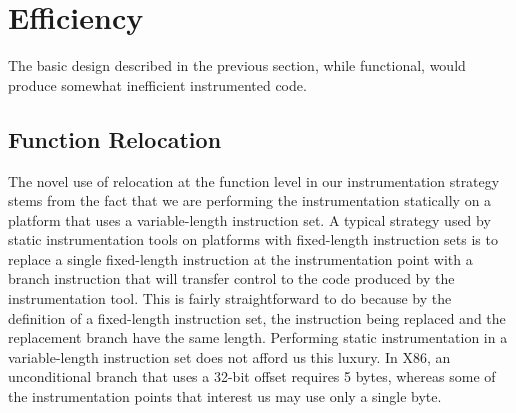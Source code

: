 \section{Efficiency}

The basic design described in the previous section, while functional, would produce
somewhat inefficient instrumented code. 


\subsection{Function Relocation}
The novel use of relocation at the function level in our instrumentation strategy stems from the fact
that we are performing the instrumentation statically on a platform that uses a
variable-length instruction set. A typical strategy used by static
instrumentation tools on platforms with fixed-length instruction sets is to
replace a single fixed-length instruction at the instrumentation point with a
branch instruction that will transfer control to the code produced by the
instrumentation tool. This is fairly straightforward to do because by the
definition of a fixed-length instruction set, the instruction being replaced and
the replacement branch have the same length. Performing static instrumentation
in a variable-length instruction set does not afford us this luxury. In X86, an
unconditional branch that uses a 32-bit offset requires 5 bytes, whereas some of
the instrumentation points that interest us may use only a single byte.


